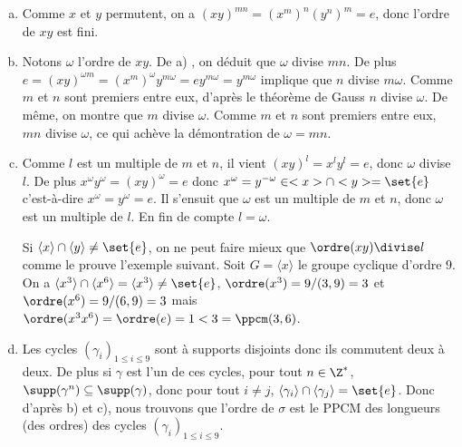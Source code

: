 \begin{enumerate}[a)]
\item 
  Comme $x$ et $y$ permutent, on a $(xy)^{mn} = (x^m)^n(y^n)^m = e$, donc l'ordre de 
  $xy$ est fini.

\item 
  Notons $\omega$ l'ordre de $xy$. De a) , on déduit que 
  $\omega$ divise $mn$. De plus  
  $e =(xy)^{\omega m} = (x^m)^\omega y^{m\omega} = e y^{m\omega} = y^{m\omega}$ 
  implique que $n$ divise $m\omega$. Comme $m$ et $n$ sont premiers entre eux,
  d'après le théorème de Gauss $n$ divise $\omega$. De même, on montre que
  $m$ divise $\omega$. Comme $m$ et $n$ sont premiers entre eux, $mn$ divise
  $\omega$, ce qui achève la démontration de $\omega = mn$.  

\item 
  Comme $l$ est un multiple de $m$ et $n$, il vient $(xy)^l = x^l y^l = e$, donc
  $\omega$ divise $l$. De plus $x^\omega y^\omega = (xy)^\omega = e$  donc
  $x^\omega = y^{-\omega}\in<x>\cap<y> = \set{e}$ c'est-à-dire $x^\omega =
  y^\omega = e$. Il s'ensuit que $\omega$ est un multiple de $m$ et $n$, donc
  $\omega$ est un multiple de $l$.  En fin de compte $l = \omega$.
  
  Si $\langle x \rangle\cap\langle y \rangle\neq\set{e}$,
  on ne peut faire mieux que $\ordre(xy)\divise l$ comme le prouve l'exemple
  suivant. Soit $G = \langle x \rangle$ le groupe cyclique d'ordre $9$. On a
  $\langle x^3\rangle\cap\langle x^6\rangle = \langle x^3\rangle\neq\set{e}$,
  $\ordre(x^3) = 9/(3,9) = 3$ et $\ordre(x^6) = 9/(6,9) = 3$ mais
  $\ordre(x^3 x^6)=\ordre(e) = 1 < 3 = \ppcm(3,6)$.

\item 
  Les cycles $(\gamma_i)_{1\leq i\leq 9}$ sont à supports disjoints
  donc ils commutent deux à deux. De plus si $\gamma$ est l'un de ces cycles,
  pour tout $n\in\Z^*$, $\supp(\gamma^n)\subseteq\supp(\gamma)$, donc pour tout
  $i\neq j$, $\langle\gamma_i\rangle\cap\langle\gamma_j\rangle=\set{e}$. Donc
  d'après b) et c), nous trouvons que l'ordre de $\sigma$ est le PPCM des
  longueurs (des ordres) des cycles $(\gamma_i)_{1\leq i\leq 9}$.
\end{enumerate}

